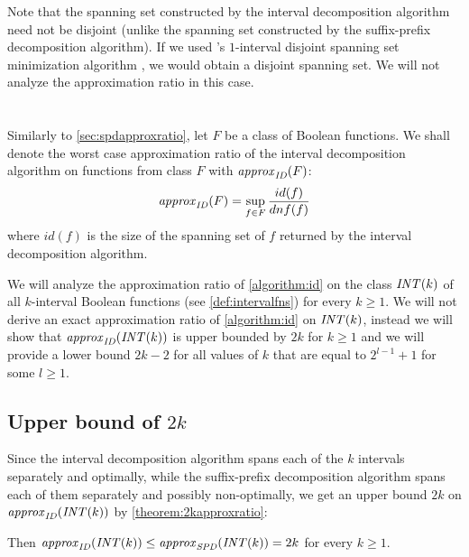 Note that the spanning set constructed
by the interval decomposition algorithm
need not be disjoint
(unlike the spanning set constructed
by the suffix-prefix decomposition algorithm).
If we used \citeauthor{Schieber2005154}'s
$1$-interval disjoint spanning set minimization algorithm
\citep{Schieber2005154},
we would obtain a disjoint spanning set.
We will not analyze the approximation ratio in this case.

\section{\titleapproxratio}

Similarly to \cref{sec:spdapproxratio},
let $F$ be a class of Boolean functions.
We shall denote the worst case approximation ratio
of the interval decomposition algorithm
on functions from class $F$ with $\mathit{approx}_{\mathit{ID}} (F)$:
$$
\mathit{approx}_{\mathit{ID}} (F)
= \sup_{f \in F}{\frac{id(f)}{dnf(f)}}
$$
where $id(f)$ is the size of the spanning set of $f$
returned by the interval decomposition algorithm.

We will analyze the approximation ratio
of \cref{algorithm:id}
on the class $\mathit{INT} (k)$
of all $k$-interval Boolean functions
(see \cref{def:intervalfns})
for every $k \geq 1$.
We will not derive an exact approximation ratio of \cref{algorithm:id} on $\mathit{INT} (k)$,
instead we will show that $\mathit{approx}_{\mathit{ID}} (\mathit{INT} (k))$ is upper bounded by $2k$ for $k \geq 1$
and we will provide a lower bound $2k-2$
for all values of $k$
that are equal to $2^{l-1} + 1$ for some $l \geq 1$.

\subsection{Upper bound of \texorpdfstring{$2k$}{2k}}

Since the interval decomposition algorithm
spans each of the $k$ intervals separately and optimally,
while the suffix-prefix decomposition algorithm
spans each of them separately and possibly non-optimally,
we get an upper bound $2k$
on $\mathit{approx}_{\mathit{ID}} (\mathit{INT} (k))$ by \cref{theorem:2kapproxratio}:

\begin{observation}
\label{observation:approxidintkupper}
Then $\mathit{approx}_{\mathit{ID}} (\mathit{INT} (k)) \leq \mathit{approx}_{\mathit{SPD}} (\mathit{INT} (k)) = 2k$
for every $k \geq 1$.
\end{observation}

